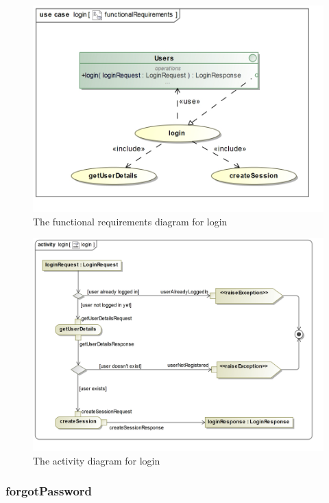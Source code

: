 \begin{figure}[H]
	\centering
	\includegraphics[width=1.1\textwidth]{../images/funcReq/loginFunctionalRequirements.jpg}
	\caption{The functional requirements diagram for login \label{overflow}}
\end{figure}

\begin{figure}[H]
	\centering
	\includegraphics[width=1.1\textwidth]{../images/funcReq/loginActivityDiagram.jpg}
	\caption{The activity diagram for login \label{overflow}}
\end{figure}

\subsubsection{forgotPassword}

